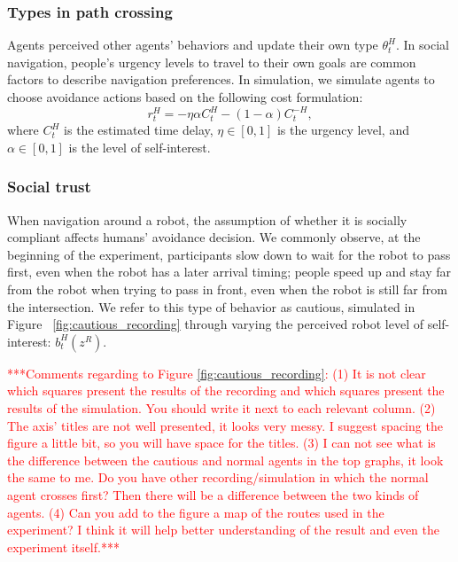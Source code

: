 \documentclass[letterpaper, 10 pt, conference]{ieeeconf}  %
\begin{document}
\subsubsection{Types in path crossing}
Agents perceived other agents' behaviors and update their own type $\theta^H_t$. In social navigation, 
people's urgency levels to travel to their own goals are common factors to 
describe navigation preferences. In simulation, we simulate agents to choose 
avoidance actions based on the following cost formulation:
\begin{equation}
  r^H_t = -\eta \alpha C^H_t  -(1-\alpha) C^{-H}_t,
\end{equation}
where $C^H_t$ is the estimated time delay, $\eta \in [0,1]$ is the urgency 
level, and $\alpha \in [0,1]$ is the level of self-interest.

\subsubsection{Social trust}
When navigation around a robot, the assumption of whether it is socially compliant affects humans' avoidance decision. We commonly observe, at the beginning of the experiment, participants slow down to wait for the robot to pass first, even when the robot has a later arrival timing; people speed up and stay far from the robot when trying to pass in front, even when the robot is still far from the intersection. 
We refer to this type of behavior as cautious, simulated in Figure ~\ref{fig:cautious_recording} through 
varying the perceived robot level of self-interest: $b^H_t(z^R)$. 

\textcolor{red}{***Comments regarding to Figure \ref{fig:cautious_recording}: (1) It is not clear which squares present the results of the recording and which squares  present the results of the simulation. You should write it next to each relevant column. (2) The axis' titles are not well presented, it looks very messy. I suggest spacing the figure a little bit, so you will have space for the titles. (3) I can not see what is the difference between the cautious and normal agents in the top graphs, it look the same to me. Do you have other recording/simulation in which the normal agent crosses first? Then there will be a difference between the two kinds of agents. (4) Can you add to the figure a map of the routes used in the experiment? I think it will help better understanding of the result and even the experiment itself.*** }
\end{document}

